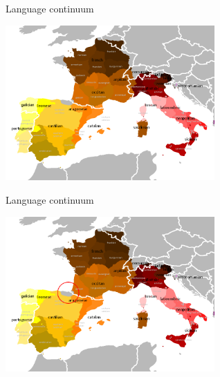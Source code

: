 \documentclass{beamer}
\begin{document}
\begin{frame}{Language continuum}
  \begin{minipage}[t][.7\textheight]{\textwidth}
    \vskip 1cm
    \begin{center}
      \includegraphics[width=0.6\textwidth]{romance.png}
    \end{center}
\end{minipage}
\vfill
\color{gray}
\color{black}
\end{frame}
  

\begin{frame}{Language continuum}
  \begin{minipage}[t][.7\textheight]{\textwidth}
    \vskip 1cm
    \begin{center}
      \includegraphics[width=0.6\textwidth]{romance_basque.png}
    \end{center}
\end{minipage}
\vfill
\color{gray}
\color{black}
\end{frame}
\end{document}

